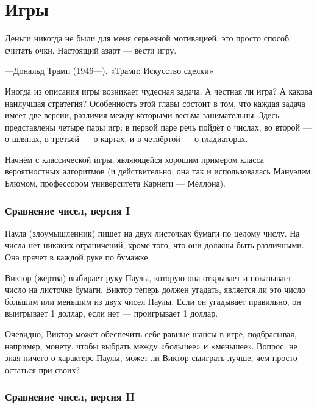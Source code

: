 \chapter*{Игры}

\setlength{\epigraphwidth}{.6\textwidth}
\epigraph{Деньги никогда не были для меня серьезной мотивацией, это просто способ считать очки.
Настоящий азарт --- вести игру.}{---Дональд Трамп (1946---).
«Трамп: Искусство сделки»}

Иногда  из описания игры возникает чудесная задача.
А честная ли игра? А какова наилучшая стратегия? Особенность этой главы состоит в том, что каждая задача имеет две версии, различия между которыми весьма занимательны.
Здесь представлены четыре пары игр: в первой паре речь пойдёт о числах, во второй --- о шляпах, в третьей --- о картах, и в четвёртой --- о гладиаторах.

\medskip

Начнём с классической игры, являющейся  хорошим примером класса вероятностных алгоритмов (и действительно, она так и использовалась Мануэлем Блюмом,  профессором университета Карнеги --- Меллона). %

\subsection*{Сравнение чисел, версия I} %

Паула (злоумышленник) пишет на двух листочках бумаги по целому числу.
На числа нет никаких ограничений, кроме того, что они должны быть различными.
Она прячет в каждой руке по бумажке.

Виктор (жертва) выбирает руку Паулы, которую она открывает и показывает число на листочке бумаги.
Виктор теперь должен угадать, является ли это число б\'{о}льшим или меньшим из двух чисел Паулы.
Если он угадывает правильно, он выигрывает 1 доллар, если нет --- проигрывает 1 доллар.

Очевидно, Виктор может обеспечить себе равные шансы в игре, подбрасывая, например, монету, чтобы выбрать между «большее» и «меньшее».
Вопрос: не зная ничего о характере Паулы, может ли Виктор сыиграть лучше, чем просто остаться при своих?

\subsection*{Сравнение чисел, версия II} %

